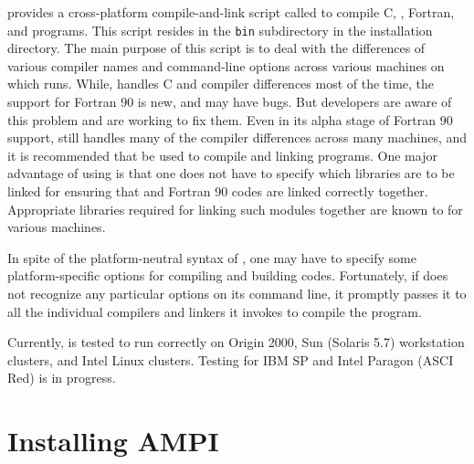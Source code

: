 \documentclass[10pt]{article}
\begin{document}
\charmpp{} provides a cross-platform compile-and-link script called \charmc{}
to compile C, \CC{}, Fortran, \charmpp{} and \ampi{} programs.  This script
resides in the \texttt{bin} subdirectory in the \charmpp{} installation
directory. The main purpose of this script is to deal with the differences of
various compiler names and command-line options across various machines on
which \charmpp{} runs. While, \charmc{} handles C and \CC{} compiler
differences most of the time, the support for Fortran 90 is new, and may have
bugs. But \charmpp{} developers are aware of this problem and are working to
fix them. Even in its alpha stage of Fortran 90 support, \charmc{} still
handles many of the compiler differences across many machines, and it is
recommended that \charmc{} be used to compile and linking \ampi{} programs. One
major advantage of using \charmc{} is that one does not have to specify which
libraries are to be linked for ensuring that \CC{} and Fortran 90 codes are
linked correctly together. Appropriate libraries required for linking such
modules together are known to \charmc{} for various machines.

In spite of the platform-neutral syntax of \charmc{}, one may have to specify
some platform-specific options for compiling and building \ampi{} codes.
Fortunately, if \charmc{} does not recognize any particular options on its
command line, it promptly passes it to all the individual compilers and linkers
it invokes to compile the program.

Currently, \ampi{} is tested to run correctly on Origin 2000, Sun (Solaris 5.7)
workstation clusters, and Intel Linux clusters. Testing for IBM SP and Intel
Paragon (ASCI Red) is in progress.

\appendix

\section{Installing AMPI}
\end{document}
